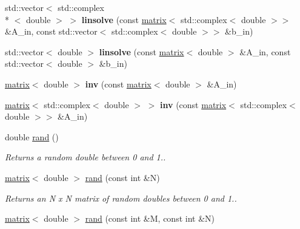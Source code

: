 \begin{DoxyCompactItemize}
\item 
\hypertarget{namespacekeycpp_a9f68b3d9143ad3582e59dd0a4b1998b8}{std\-::vector$<$ std\-::complex\\*
$<$ double $>$ $>$ {\bfseries linsolve} (const \hyperlink{classkeycpp_1_1matrix}{matrix}$<$ std\-::complex$<$ double $>$$>$ \&A\-\_\-in, const std\-::vector$<$ std\-::complex$<$ double $>$$>$ \&b\-\_\-in)}\label{namespacekeycpp_a9f68b3d9143ad3582e59dd0a4b1998b8}

\item 
\hypertarget{namespacekeycpp_a46f4a25648e5bad1cf0bd0e7fca7fae0}{std\-::vector$<$ double $>$ {\bfseries linsolve} (const \hyperlink{classkeycpp_1_1matrix}{matrix}$<$ double $>$ \&A\-\_\-in, const std\-::vector$<$ double $>$ \&b\-\_\-in)}\label{namespacekeycpp_a46f4a25648e5bad1cf0bd0e7fca7fae0}

\item 
\hypertarget{namespacekeycpp_adc96927cda2df7a6e8e2031941c43601}{\hyperlink{classkeycpp_1_1matrix}{matrix}$<$ double $>$ {\bfseries inv} (const \hyperlink{classkeycpp_1_1matrix}{matrix}$<$ double $>$ \&A\-\_\-in)}\label{namespacekeycpp_adc96927cda2df7a6e8e2031941c43601}

\item 
\hypertarget{namespacekeycpp_a6b74369f5415c3ed45f63995149ad992}{\hyperlink{classkeycpp_1_1matrix}{matrix}$<$ std\-::complex$<$ double $>$ $>$ {\bfseries inv} (const \hyperlink{classkeycpp_1_1matrix}{matrix}$<$ std\-::complex$<$ double $>$$>$ \&A\-\_\-in)}\label{namespacekeycpp_a6b74369f5415c3ed45f63995149ad992}

\item 
\hypertarget{namespacekeycpp_a5ef5c1f5951e8182a7c4ec9612f3f7e1}{double \hyperlink{namespacekeycpp_a5ef5c1f5951e8182a7c4ec9612f3f7e1}{rand} ()}\label{namespacekeycpp_a5ef5c1f5951e8182a7c4ec9612f3f7e1}

\begin{DoxyCompactList}\small\item\em Returns a random double between 0 and 1.. \end{DoxyCompactList}\item 
\hypertarget{namespacekeycpp_ae5c6c79ad914131dfc2b0ae22c6d5017}{\hyperlink{classkeycpp_1_1matrix}{matrix}$<$ double $>$ \hyperlink{namespacekeycpp_ae5c6c79ad914131dfc2b0ae22c6d5017}{rand} (const int \&N)}\label{namespacekeycpp_ae5c6c79ad914131dfc2b0ae22c6d5017}

\begin{DoxyCompactList}\small\item\em Returns an N x N matrix of random doubles between 0 and 1.. \end{DoxyCompactList}\item 
\hypertarget{namespacekeycpp_a259b4e27cc4ec4d79d27688fdafcf2ca}{\hyperlink{classkeycpp_1_1matrix}{matrix}$<$ double $>$ \hyperlink{namespacekeycpp_a259b4e27cc4ec4d79d27688fdafcf2ca}{rand} (const int \&M, const int \&N)}\label{namespacekeycpp_a259b4e27cc4ec4d79d27688fdafcf2ca}


\end{DoxyCompactItemize}

